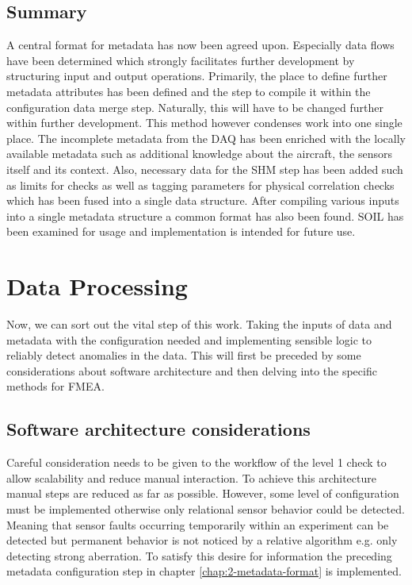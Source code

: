 \subsection{Summary}
A central format for metadata has now been agreed upon. Especially data flows have been determined which strongly facilitates further development by structuring input and output operations. Primarily, the place to define further metadata attributes has been defined and the step to compile it within the configuration data merge step. Naturally, this will have to be changed further within further development. This method however condenses work into one single place.
The incomplete metadata from the DAQ has been enriched with the locally available metadata such as additional knowledge about the aircraft, the sensors itself and its context. Also, necessary data for the SHM step has been added such as limits for checks as well as tagging parameters for physical correlation checks which has been fused into a single data structure.
After compiling various inputs into a single metadata structure a common format has also been found. SOIL has been examined for usage and implementation is intended for future use.

\newpage


\section{Data Processing}
Now, we can sort out the vital step of this work. Taking the inputs of data and metadata with the configuration needed and implementing sensible logic to reliably detect anomalies in the data. This will first be preceded by some considerations about software architecture and then delving into the specific methods for FMEA.

\subsection{Software architecture considerations}


Careful consideration needs to be given to the workflow of the level 1 check to allow scalability and reduce manual interaction. To achieve this architecture manual steps are reduced as far as possible. However, some level of configuration must be implemented otherwise only relational sensor behavior could be detected. Meaning that sensor faults occurring temporarily within an experiment can be detected but permanent behavior is not noticed by a relative algorithm e.g. only detecting strong aberration. To satisfy this desire for information the preceding metadata configuration step in chapter \ref{chap:2-metadata-format} is implemented.

